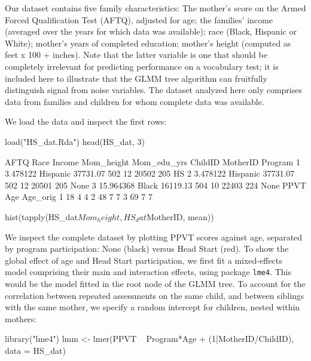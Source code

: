 \documentclass[doc,floatsintext,natbib]{apa7}
\begin{document}
Our dataset contains five family characteristics: The mother's score on the Armed Forced Qualification Test (AFTQ), adjusted for age; the families' income (averaged over the years for which data was available); race (Black, Hispanic or White); mother's years of completed education; mother's height (computed as feet x 100 + inches). Note that the latter variable is one that should be completely irrelevant for predicting performance on a vocabulary test; it is included here to illustrate that the GLMM tree algorithm can fruitfully distinguish signal from noise variables. The dataset analyzed here only comprises data from families and children for whom complete data was available. 

We load the data and inspect the first rows:

\begin{Schunk}
\begin{Sinput}
 load("HS_dat.Rda")
 head(HS_dat, 3)
\end{Sinput}
\begin{Soutput}
       AFTQ     Race   Income Mom_height Mom_edu_yrs ChildID MotherID Program
1  3.478122 Hispanic 37731.07        502          12   20502      205      HS
2  3.478122 Hispanic 37731.07        502          12   20501      205    None
3 15.964368    Black 16119.13        504          10   22403      224    None
  PPVT Age Age_orig
1   18   4        4
2   48   7        7
3   69   7        7
\end{Soutput}
\begin{Sinput}
 hist(tapply(HS_dat$Mom_height, HS_dat$MotherID, mean))
\end{Sinput}
\end{Schunk}

We inspect the complete dataset by plotting PPVT scores against age, separated by program participation: None (black) versus Head Start (red). To show the global effect of age and Head Start participation, we first fit a mixed-effects model comprising their main and interaction effects, using package \texttt{lme4}. This would be the model fitted in the root node of the GLMM tree. To account for the correlation between repeated assessments on the same child, and between siblings with the same mother, we specify a random intercept for children, nested within mothers:

\begin{Schunk}
\begin{Sinput}
 library("lme4")
 lmm <- lmer(PPVT ~ Program*Age + (1|MotherID/ChildID), data = HS_dat)
\end{Sinput}
\end{Schunk}
\end{document}
